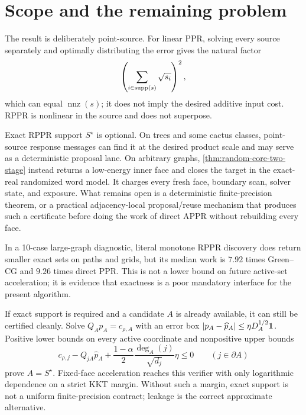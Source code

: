 \section{Scope and the remaining problem}

The result is deliberately point-source.  For linear PPR, solving every
source separately and optimally distributing the error gives the natural
factor
\begin{equation*}
 \left(\sum_{i\in\operatorname{supp}(s)}\sqrt{s_i}\right)^2,
\end{equation*}
which can equal $\operatorname{nnz}(s)$; it does not imply the desired
additive input cost.  RPPR is nonlinear in the source and does not superpose.

Exact RPPR support $S^\star$ is optional.  On trees and some cactus classes,
point-source response messages can find it at the desired product scale and
may serve as a deterministic proposal lane.  On arbitrary graphs,
\cref{thm:random-core-two-stage} instead returns a low-energy inner face and
closes the target in the exact-real randomized word model.  It charges every
fresh face, boundary scan, solver state, and exposure.  What remains open is a
deterministic finite-precision theorem, or a practical adjacency-local
proposal/reuse mechanism that produces such a certificate before doing the
work of direct APPR without rebuilding every face.

In a 10-case large-graph diagnostic, literal monotone RPPR discovery does
return smaller exact sets on paths and grids, but its median work is $7.92$
times Green--CG and $9.26$ times direct PPR.  This is not a lower bound on
future active-set acceleration; it is evidence that exactness is a poor
mandatory interface for the present algorithm.

If exact support is required and a candidate $A$ is already available, it can
still be certified cleanly.  Solve
$Q_Ap_A=c_{\rho,A}$ with an error box
$|p_A-\widehat p_A|\leq\eta D_A^{1/2}\mathbf{1}$.  Positive lower bounds on every
active coordinate and nonpositive upper bounds
\begin{equation*}
 c_{\rho,j}-Q_{jA}\widehat p_A
 +\frac{1-\alpha}{2}
  \frac{\deg_A(j)}{\sqrt{d_j}}\eta\leq0
 \qquad(j\in\partial A)
\end{equation*}
prove $A=S^\star$.  Fixed-face acceleration reaches this verifier with only
logarithmic dependence on a strict KKT margin.  Without such a margin, exact
support is not a uniform finite-precision contract; leakage is the correct
approximate alternative.

